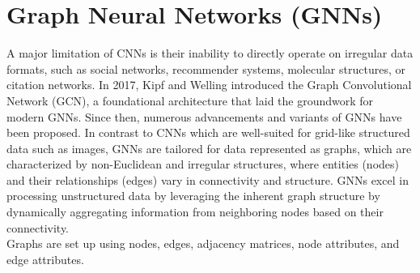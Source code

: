 \section{Graph Neural Networks (GNNs)}
A major limitation of CNNs is their inability to directly operate on irregular data formats, such as social networks, recommender systems, molecular structures, or citation networks. In 2017, Kipf and Welling \cite{kipf} introduced the Graph Convolutional Network (GCN), a foundational architecture that laid the groundwork for modern GNNs. Since then, numerous advancements and variants of GNNs have been proposed. In contrast to CNNs which are well-suited for grid-like structured data such as images, GNNs are tailored for data represented as graphs, which are characterized by non-Euclidean and irregular structures, where entities (nodes) and their relationships (edges) vary in connectivity and structure. GNNs excel in processing unstructured data by leveraging the inherent graph structure by dynamically aggregating information from neighboring nodes based on their connectivity. \\
Graphs are set up using nodes, edges, adjacency matrices, node attributes, and edge attributes. 
